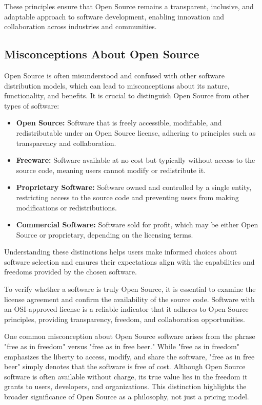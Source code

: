 These principles ensure that Open Source remains a transparent, inclusive, and adaptable approach to software development, enabling innovation and collaboration across industries and communities.

\cite{Open_Source_Initiative_OS_definition}

\subsection{Misconceptions About Open Source}

Open Source is often misunderstood and confused with other software distribution models, which can lead to misconceptions about its nature, functionality, and benefits. 
It is crucial to distinguish Open Source from other types of software:

\begin{itemize}
    \item \textbf{Open Source:} Software that is freely accessible, modifiable, and redistributable under an Open Source license, adhering to principles such as transparency and collaboration.
    \item \textbf{Freeware:} Software available at no cost but typically without access to the source code, meaning users cannot modify or redistribute it.
    \item \textbf{Proprietary Software:} Software owned and controlled by a single entity, restricting access to the source code and preventing users from making modifications or redistributions.
    \item \textbf{Commercial Software:} Software sold for profit, which may be either Open Source or proprietary, depending on the licensing terms.
\end{itemize}

Understanding these distinctions helps users make informed choices about software selection and ensures their expectations align with the capabilities and freedoms provided by the chosen software.

To verify whether a software is truly Open Source, it is essential to examine the license agreement and confirm the availability of the source code. 
Software with an OSI-approved license is a reliable indicator that it adheres to Open Source principles, providing transparency, freedom, and collaboration opportunities.

One common misconception about Open Source software arises from the phrase "free as in freedom" versus "free as in free beer." While "free as in freedom" emphasizes the liberty to access, modify, and share the software, "free as in free beer" simply denotes that the software is free of cost. 
Although Open Source software is often available without charge, its true value lies in the freedom it grants to users, developers, and organizations. 
This distinction highlights the broader significance of Open Source as a philosophy, not just a pricing model.

